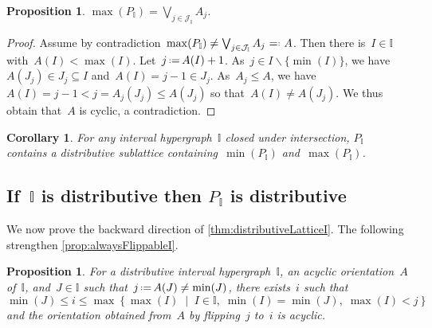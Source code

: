 \documentclass{amsart}
\newtheorem{corollary}[theorem]{Corollary}
\newtheorem{proposition}[theorem]{Proposition}
\theoremstyle{definition}
\newcommand{\cal}[1]{\mathcal{#1}} %
\newcommand{\set}[2]{\left\{ #1 \;\middle|\; #2 \right\}} %
\newcommand{\ssm}{\smallsetminus} %
\newcommand{\eqdef}{\mbox{\,\raisebox{0.2ex}{\scriptsize\ensuremath{\mathrm:}}\ensuremath{=}\,}} %
\newcommand{\defeq}{\mbox{~\ensuremath{=}\raisebox{0.2ex}{\scriptsize\ensuremath{\mathrm:}} }} %
\newcommand{\bigJoin}{\bigvee} %
\newcommand{\II}{\mathbb I} %
\newcommand{\cJ}{\cal{J}} %
\begin{document}
\begin{proposition}
$\displaystyle \max(P_\II) = \bigJoin\limits_{j \in \cJ_\II} A_j$.
\end{proposition}

\begin{proof}
Assume by contradiction~$\max(P_\II) \ne \bigJoin_{j \in \cJ_\II} A_j \defeq A$.
Then there is~$I \in \II$ with~${A(I) < \max(I)}$.
Let~$j \eqdef A(I) + 1$.
As~$j \in I \ssm \{\min(I)\}$, we have~$A(J_j) \in J_j \subseteq I$ and~$A(I) = j-1 \in J_j$.
As~$A_j \le A$, we have~$A(I) = j-1 < j = A_j(J_j) \le A(J_j)$ so that~$A(I) \ne A(J_j)$.
We thus obtain that~$A$ is cyclic, a contradiction.
\end{proof}

\begin{corollary}
For any interval hypergraph~$\II$ closed under intersection, $P_\II$ contains a distributive sublattice containing~$\min(P_\II)$ and~$\max(P_\II)$.
\end{corollary}


\subsection{If~$\II$ is distributive then $P_\II$ is distributive}
\label{subsec:distributiveLatticeBackward}

We now prove the backward direction of \cref{thm:distributiveLatticeI}.
The following strengthen \cref{prop:alwaysFlippableI}.

\begin{proposition}
\label{prop:alwaysFlippableDistributive}
For a distributive interval hypergraph~$\II$, an acyclic orientation~$A$ of~$\II$, and~${J \in \II}$ such that~$j \eqdef A(J) \ne \min(J)$, there exists~$i$ such that
\[
\min(J) \le i \le \max\set{\max(I)}{I \in \II, \; \min(I) = \min(J), \; \max(I) < j}
\]
and the orientation obtained from~$A$ by flipping~$j$ to~$i$ is acyclic.
\end{proposition}
\end{document}
